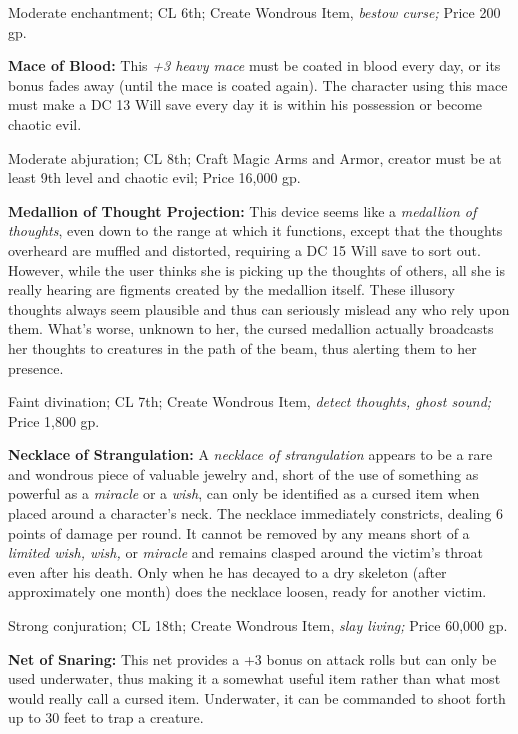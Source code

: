 \documentclass{article}
\begin{document}
Moderate enchantment; CL 6th; Create Wondrous Item, \textit{bestow curse; }Price 
200 gp.

\textbf{Mace of Blood:} This \textit{+3 heavy mace }must be coated in blood every 
day, or its bonus fades away (until the mace is coated again). The character using 
this mace must make a DC 13 Will save every day it is within his possession or 
become chaotic evil.

Moderate abjuration; CL 8th; Craft Magic Arms and Armor, creator must be at least 
9th level and chaotic evil; Price 16,000 gp.

\textbf{Medallion of Thought Projection:} This device seems like a \textit{medallion 
of thoughts}, even down to the range at which it functions, except that the thoughts 
overheard are muffled and distorted, requiring a DC 15 Will save to sort out. However, 
while the user thinks she is picking up the thoughts of others, all she is really 
hearing are figments created by the medallion itself. These illusory thoughts always 
seem plausible and thus can seriously mislead any who rely upon them. What's worse, 
unknown to her, the cursed medallion actually broadcasts her thoughts to creatures 
in the path of the beam, thus alerting them to her presence.

Faint divination; CL 7th; Create Wondrous Item, \textit{detect thoughts, ghost 
sound; }Price 1,800 gp.

\textbf{Necklace of Strangulation:} A \textit{necklace of strangulation }appears 
to be a rare and wondrous piece of valuable jewelry and, short of the use of something 
as powerful as a \textit{miracle }or a \textit{wish}, can only be identified as 
a cursed item when placed around a character's neck. The necklace immediately constricts, 
dealing 6 points of damage per round. It cannot be removed by any means short of 
a \textit{limited wish, wish, }or \textit{miracle }and remains clasped around the 
victim's throat even after his death. Only when he has decayed to a dry skeleton 
(after approximately one month) does the necklace loosen, ready for another victim.

Strong conjuration; CL 18th; Create Wondrous Item, \textit{slay living; }Price 
60,000 gp.

\textbf{Net of Snaring: }This net provides a +3 bonus on attack rolls but can only 
be used underwater, thus making it a somewhat useful item rather than what most 
would really call a cursed item. Underwater, it can be commanded to shoot forth 
up to 30 feet to trap a creature.
\end{document}
